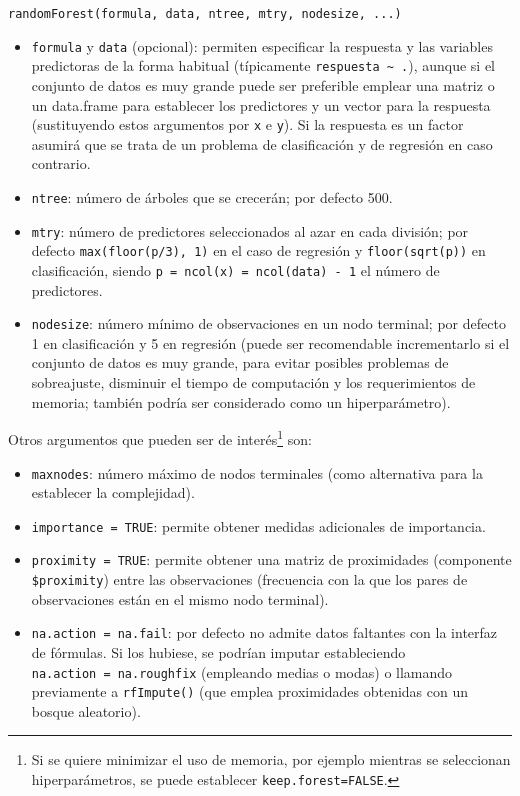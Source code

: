 \documentclass[
  spanish,
]{book}
\theoremstyle{break}
\theoremstyle{definition}
\theoremstyle{definition}
\theoremstyle{definition}
\theoremstyle{definition}
\theoremstyle{remark}
\begin{document}
\texttt{randomForest(formula,\ data,\ ntree,\ mtry,\ nodesize,\ ...)}

\begin{itemize}
\item
  \texttt{formula} y \texttt{data} (opcional): permiten especificar la respuesta y las variables predictoras de la forma habitual (típicamente \texttt{respuesta\ \textasciitilde{}\ .}), aunque si el conjunto de datos es muy grande puede ser preferible emplear una matriz o un data.frame para establecer los predictores y un vector para la respuesta (sustituyendo estos argumentos por \texttt{x} e \texttt{y}).
  Si la respuesta es un factor asumirá que se trata de un problema de clasificación y de regresión en caso contrario.
\item
  \texttt{ntree}: número de árboles que se crecerán; por defecto 500.
\item
  \texttt{mtry}: número de predictores seleccionados al azar en cada división; por defecto \texttt{max(floor(p/3),\ 1)} en el caso de regresión y \texttt{floor(sqrt(p))} en clasificación, siendo \texttt{p\ =\ ncol(x)\ =\ ncol(data)\ -\ 1} el número de predictores.
\item
  \texttt{nodesize}: número mínimo de observaciones en un nodo terminal; por defecto 1 en clasificación y 5 en regresión (puede ser recomendable incrementarlo si el conjunto de datos es muy grande, para evitar posibles problemas de sobreajuste, disminuir el tiempo de computación y los requerimientos de memoria; también podría ser considerado como un hiperparámetro).
\end{itemize}

Otros argumentos que pueden ser de interés\footnote{Si se quiere minimizar el uso de memoria, por ejemplo mientras se seleccionan hiperparámetros, se puede establecer \texttt{keep.forest=FALSE}.} son:

\begin{itemize}
\item
  \texttt{maxnodes}: número máximo de nodos terminales (como alternativa para la establecer la complejidad).
\item
  \texttt{importance\ =\ TRUE}: permite obtener medidas adicionales de importancia.
\item
  \texttt{proximity\ =\ TRUE}: permite obtener una matriz de proximidades (componente \texttt{\$proximity}) entre las observaciones (frecuencia con la que los pares de observaciones están en el mismo nodo terminal).
\item
  \texttt{na.action\ =\ na.fail}: por defecto no admite datos faltantes con la interfaz de fórmulas. Si los hubiese, se podrían imputar estableciendo \texttt{na.action\ =\ na.roughfix} (empleando medias o modas) o llamando previamente a \texttt{rfImpute()} (que emplea proximidades obtenidas con un bosque aleatorio).
\end{itemize}
\end{document}
